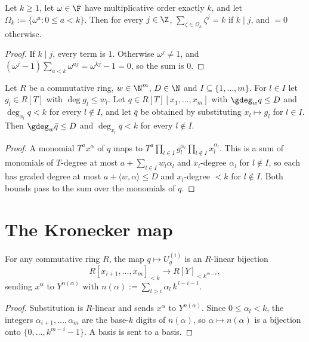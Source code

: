 \begin{lemma}\label{lem:rootsum}
Let $k\ge1$, let $\omega\in\F$ have multiplicative order exactly $k$, and let
$\Omega_k:=\{\omega^a:0\le a<k\}$. Then for every $j\in\Z$,
$\sum_{\zeta\in\Omega_k}\zeta^j=k$ if $k\mid j$, and $=0$ otherwise.
\end{lemma}

\begin{proof}
If $k\mid j$, every term is $1$. Otherwise $\omega^j\ne1$, and
$(\omega^j-1)\sum_{a<k}\omega^{aj}=\omega^{kj}-1=0$, so the sum is $0$.
\end{proof}

\begin{lemma}\label{lem:subst}
Let $R$ be a commutative ring, $w\in\N^m$, $D\in\N$ and $I\subseteq\{1,\dots,m\}$. For $l\in I$
let $g_l\in R[T]$ with $\deg g_l\le w_l$. Let $q\in R[T][x_1,\dots,x_m]$ with $\gdeg_wq\le D$ and
$\deg_{x_l}q<k$ for every $l\notin I$, and let $\bar q$ be obtained by substituting $x_l\mapsto g_l$
for $l\in I$. Then $\gdeg_w\bar q\le D$ and $\deg_{x_l}\bar q<k$ for every $l\notin I$.
\end{lemma}

\begin{proof}
A monomial $T^ax^\alpha$ of $q$ maps to
$T^a\prod_{l\in I}g_l^{\alpha_l}\prod_{l\notin I}x_l^{\alpha_l}$. This is a sum of monomials of
$T$-degree at most $a+\sum_{l\in I}w_l\alpha_l$ and $x_l$-degree $\alpha_l$ for $l\notin I$, so
each has graded degree at most $a+\langle w,\alpha\rangle\le D$ and $x_l$-degree $<k$ for
$l\notin I$. Both bounds pass to the sum over the monomials of $q$.
\end{proof}

\section{The Kronecker map}

\begin{lemma}\label{lem:kron}
For any commutative ring $R$, the map $q\mapsto U^{(i)}_q$ is an $R$-linear bijection
\[
R[x_{i+1},\dots,x_m]_{<k}\longrightarrow R[Y]_{<k^{m-i}},
\]
sending $x^\alpha$ to $Y^{n(\alpha)}$ with $n(\alpha):=\sum_{l>i}\alpha_l\,k^{\,l-i-1}$.
\end{lemma}

\begin{proof}
Substitution is $R$-linear and sends $x^\alpha$ to $Y^{n(\alpha)}$. Since $0\le\alpha_l<k$,
the integers $\alpha_{i+1},\dots,\alpha_m$ are the base-$k$ digits of $n(\alpha)$, so
$\alpha\mapsto n(\alpha)$ is a bijection onto $\{0,\dots,k^{m-i}-1\}$. A basis is sent to a
basis.
\end{proof}

